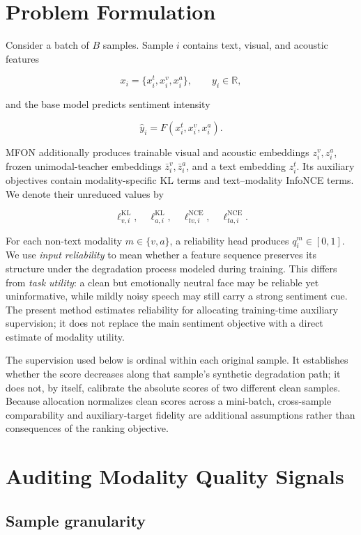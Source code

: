 \section{Problem Formulation}\label{problem-formulation}

Consider a batch of \(B\) samples. Sample \(i\) contains text, visual,
and acoustic features

\[
x_i=\{x_i^t,x_i^v,x_i^a\}, \qquad y_i\in\mathbb{R},
\]

and the base model predicts sentiment intensity

\[
\hat y_i=F(x_i^t,x_i^v,x_i^a).
\]

MFON additionally produces trainable visual and acoustic embeddings
\(z_i^v,z_i^a\), frozen unimodal-teacher embeddings
\(\bar z_i^v,\bar z_i^a\), and a text embedding \(z_i^t\). Its auxiliary
objectives contain modality-specific KL terms and text--modality InfoNCE
terms. We denote their unreduced values by

\[
\ell^{\mathrm{KL}}_{v,i},\quad
\ell^{\mathrm{KL}}_{a,i},\quad
\ell^{\mathrm{NCE}}_{tv,i},\quad
\ell^{\mathrm{NCE}}_{ta,i}.
\]

For each non-text modality \(m\in\{v,a\}\), a reliability head produces
\(q_i^m\in[0,1]\). We use \emph{input reliability} to mean whether a
feature sequence preserves its structure under the degradation process
modeled during training. This differs from \emph{task utility}: a clean
but emotionally neutral face may be reliable yet uninformative, while
mildly noisy speech may still carry a strong sentiment cue. The present
method estimates reliability for allocating training-time auxiliary
supervision; it does not replace the main sentiment objective with a
direct estimate of modality utility.

The supervision used below is ordinal within each original sample. It
establishes whether the score decreases along that sample's synthetic
degradation path; it does not, by itself, calibrate the absolute scores of two
different clean samples. Because allocation normalizes clean scores across a
mini-batch, cross-sample comparability and auxiliary-target fidelity are
additional assumptions rather than consequences of the ranking objective.

\section{Auditing Modality Quality
Signals}\label{auditing-modality-quality-signals}

\subsection{Sample granularity}\label{sample-granularity}

